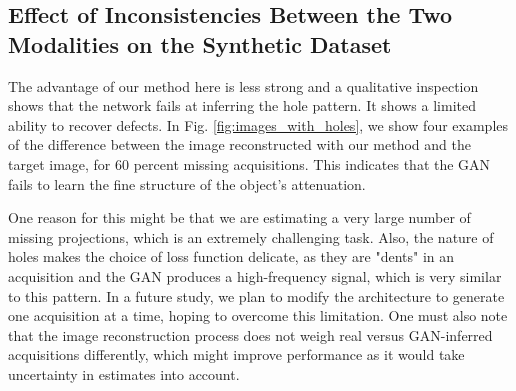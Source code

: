 \documentclass[../main.tex]{subfiles}
\begin{document}
\subsection{Effect of Inconsistencies Between the Two Modalities on the Synthetic Dataset}
\label{inconsistencies}
The advantage of our method here is less strong and a qualitative inspection shows that the network fails at inferring the hole pattern. It shows a limited ability to recover defects. In Fig. \ref{fig:images_with_holes}, we show four examples of the difference between the image reconstructed with our method and the target image, for 60 percent missing acquisitions. This indicates that the GAN fails to learn the fine structure of the object's attenuation.

One reason for this might be that we are estimating a very large number of missing projections, which is an extremely challenging task. Also, the nature of holes makes the choice of loss function delicate, as they are "dents" in an acquisition and the GAN produces a high-frequency signal, which is very similar to this pattern. In a future study, we plan to modify the architecture to generate one acquisition at a time, hoping to overcome this limitation. One must also note that the image reconstruction process does not weigh real versus GAN-inferred acquisitions differently, which might improve performance as it would take uncertainty in estimates into account.
\end{document}
